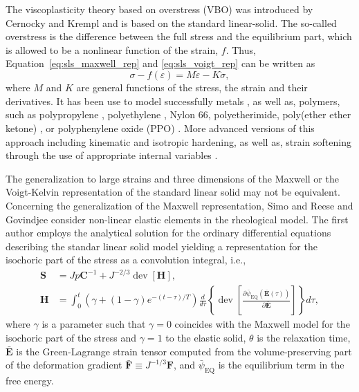 The viscoplasticity theory based on overstress (VBO) was introduced by Cernocky and Krempl \citep{cernockyTheoryViscoplasticityBased1980} and is based on the standard linear-solid.
The so-called overstress is the difference between the full stress and the equilibrium part, which is allowed to be a nonlinear function of the strain, $f$.
Thus, Equation~\eqref{eq:sls_maxwell_rep} and \eqref{eq:sls_voigt_rep} can be written as
\begin{equation}
	\sigma - f(\varepsilon) = M\dot\varepsilon - K\dot \sigma,
\end{equation}
where $M$ and $K$ are general functions of the stress, the strain and their derivatives.
It has been use to model successfully metals \citep{liuUniaxialViscoplasticModel1979, yaoViscoplasticityTheoryBased1985}, as well as, polymers, such as polypropylene \citep{kitagawaRatedependentNonlinearConstitutive1989}, polyethylene \citep{kitagawaNonlinearConstitutiveEquation1990}, Nylon 66, polyetherimide, poly(ether ether ketone) \citep{krempl2000overstress}, or polyphenylene oxide (PPO) \citep{colakModelingDeformationBehavior2005}.
More advanced versions of this approach including kinematic and isotropic hardening, as well as, strain softening through the use of appropriate internal variables \citep{krempl2000overstress, hoExtensionViscoplasticityTheory2002}.

The generalization to large strains and three dimensions of the Maxwell or the Voigt-Kelvin representation of the standard linear solid may not be equivalent.
Concerning the generalization of the Maxwell representation, Simo \citep{simoFullyThreedimensionalFinitestrain1987} and Reese and Govindjee \citep{reeseTheoryFiniteViscoelasticity1998} consider non-linear elastic elements in the rheological model.
The first author employs the analytical solution for the ordinary differential equations describing the standar linear solid model yielding a representation for the isochoric part of the stress as a convolution integral, i.e.,
\begin{align}
	\mathbf S &= Jp\mathbf C^{-1} + J^{-2/3}\operatorname{dev}[\mathbf H],\\
	\mathbf H &= \int_0^t (\gamma + (1-\gamma)e^{-(t-\tau)/T}) \frac{d}{d\tau}\left\{\operatorname{dev} \left[\frac{\partial {\bar\psi}_\text{EQ}(\bar{\mathbf E}(\tau))}{\partial \bar{\mathbf E}}\right]\right\}  d\tau,
\end{align}
where $\gamma$ is a parameter such that $\gamma=0$ coincides with the Maxwell model for the isochoric part of the stress and $\gamma=1$ to the elastic solid, $\theta$ is the relaxation time, $\bar{\bm E}$ is the Green-Lagrange strain tensor computed from the volume-preserving part of the deformation gradient $\bar{\bm F} \equiv J^{-1/3} \bm F$, and $\bar{\psi	}_\text{EQ}$ is the equilibrium term in the free energy.

